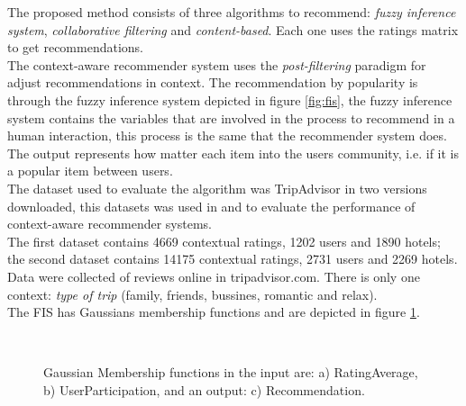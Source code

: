The proposed method consists of three algorithms to recommend: 
\textit{fuzzy inference system}, \textit{collaborative filtering} and 
\textit{content-based}. Each one
uses the ratings matrix to get recommendations.\\    
The context-aware recommender system uses the \textit{post-filtering}
paradigm\cite{adomavicius2011context} for adjust recommendations in
context. The recommendation by popularity is through the fuzzy
inference system depicted in figure \ref{fig:fis}, the fuzzy inference
system contains the variables that are involved in the process to
recommend in a human interaction, this process is the same that the
recommender system does. \\The output represents how matter each item
into the users community, i.e. if it is a popular item between users. \\
The dataset used to evaluate the algorithm was TripAdvisor in two
versions downloaded\cite{linkzeng}, this datasets was used in
\cite{zheng2014context} and \cite{zheng2012differential} to  evaluate the
performance of context-aware recommender systems. \\The first
dataset contains 4669 contextual ratings, 1202 users and 1890 hotels;
the second dataset contains 14175 contextual ratings, 2731 users and
2269 hotels. Data were collected of reviews online in tripadvisor.com.
There is only one context: \textit{type of trip} (family, friends, bussines,
romantic and relax).\\ 
The FIS has Gaussians membership functions and are depicted in figure
\ref{fig:mffis}.
\begin{figure}[ht!]
   \captionsetup{font=footnotesize}
   \centering
   \hspace{0.1\linewidth}
   \\[20pt]
   \caption{Gaussian Membership functions in the input are: a) RatingAverage, 
   b) UserParticipation, and an output: c) Recommendation.}
   \label{fig:mffis} 
\end{figure}
